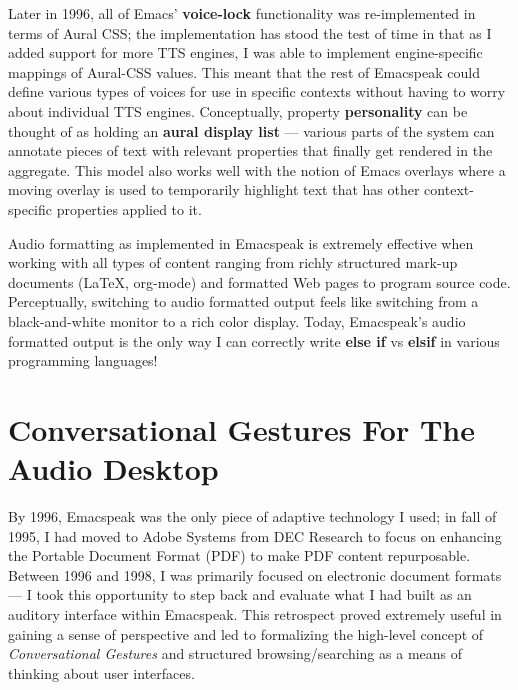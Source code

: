 \documentclass[11pt]{article}
\begin{document}
Later in 1996, all of Emacs' \textbf{voice-lock} functionality was
re-implemented in terms of Aural CSS; the implementation has
stood the test of time in that as I added support for more TTS
engines, I was able to implement engine-specific mappings of
Aural-CSS values. This meant that the rest of Emacspeak could
define various types of voices for use in specific contexts
without having to worry about individual TTS
engines. Conceptually, property \textbf{personality} can be thought of
as holding an \textbf{aural display list} — various parts of the system
can annotate pieces of text with relevant properties that finally
get rendered in the aggregate. This model also works well with
the notion of Emacs overlays where a moving overlay is used to
temporarily highlight text that has other context-specific
properties applied to it.


Audio formatting as implemented in Emacspeak is extremely
effective when working with all types of content ranging from
richly structured mark-up documents (\LaTeX{}, org-mode) and
formatted Web pages to program source code. Perceptually,
switching to audio formatted output feels like switching from a
black-and-white monitor to a rich color display. Today,
Emacspeak's audio formatted output is the only way I can
correctly write \textbf{else if} vs \textbf{elsif} in various programming
languages!

\section{Conversational Gestures For The Audio Desktop}
\label{sec-9}

By 1996, Emacspeak was the only piece of adaptive technology I
used; in fall of 1995, I had moved to Adobe Systems from DEC
Research to focus on enhancing the Portable Document Format (PDF)
to make PDF content repurposable. Between 1996 and 1998, I was
primarily focused on electronic document formats — I took this
opportunity to step back and evaluate what I had built as an
auditory interface within Emacspeak. This retrospect proved
extremely useful in gaining a sense of perspective and led to
formalizing the high-level concept of \emph{Conversational Gestures}
and structured browsing/searching as a means of thinking about
user interfaces.
\end{document}
